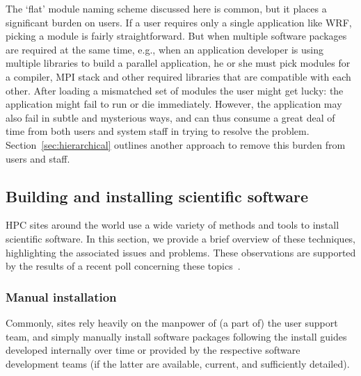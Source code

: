 The `flat' module naming scheme discussed here is common, but it places a significant
burden on users. If a user requires only a single application like WRF, picking a
module is fairly straightforward. But when multiple software packages are required
at the same time, e.g., when an application developer is using multiple libraries to
build a parallel application, he or she must pick modules for a
compiler, MPI stack and other required libraries that are compatible with each other.
After loading a mismatched set of modules the user might get lucky: the application might fail to run or die immediately.  However, the
application may also fail in subtle and mysterious ways, and can thus consume a
great deal of time from both users and system staff in trying to resolve the problem.
Section~\ref{sec:hierarchical} outlines another approach to remove this burden
from users and staff.


%
%


\subsection{Building and installing scientific software}
\label{sec:installing}

HPC sites around the world use a wide variety of methods and tools to
install scientific software. In this section, we provide a brief
overview of these techniques,
highlighting the associated issues and problems. These observations are
supported by the results of a recent poll concerning these
topics~\cite{ISC14bof}.

\subsubsection{Manual installation}

Commonly, sites rely heavily on the manpower of (a part of)
the user support team, and simply manually install software packages following
the install guides developed internally over time or provided
by the respective software development teams (if the latter are available, current, and
sufficiently detailed).

